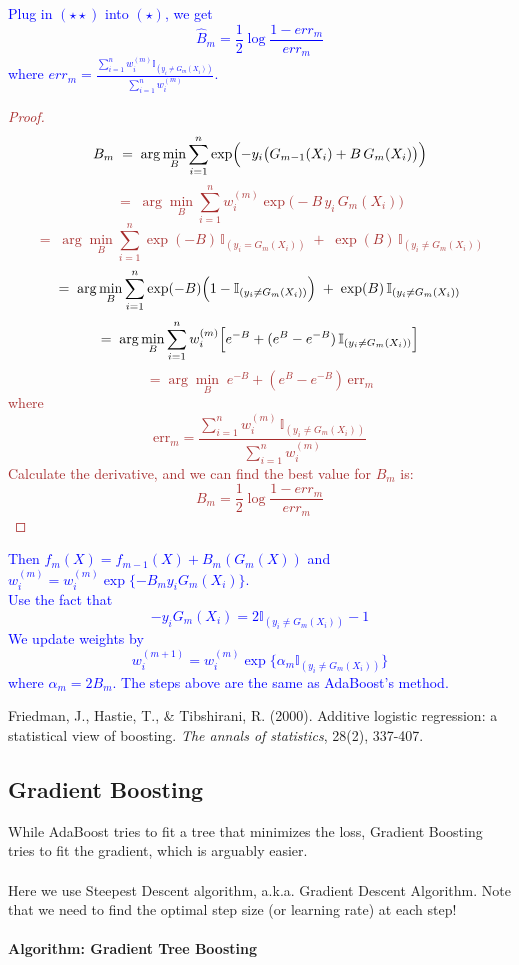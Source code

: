 \documentclass[12pt]{book}
\theoremstyle{definition}
\theoremstyle{remark}
\begin{document}
\textcolor{blue}{
Plug in $(\star\star)$ into $(\star)$, we get
\[\hat{B}_m = \frac12\log \frac{1-err_m}{err_m}\]
where $err_m = \frac{\sum_{i=1}^n w_i^{(m)}\mathbb{I}_{(y_i \ne G_m(X_i))}}{\sum_{i=1}^n w_i^{(m)}}$.}
\textcolor{brown}{
\begin{proof}
\[
B_m \;=\;\arg\min_{B}\sum_{i=1}^n\exp\Bigl(-y_i\bigl(G_{m-1}(X_i)+B\,G_m(X_i)\bigr)\Bigr)
\]
\[=\;\arg\min_{B}\sum_{i=1}^n w_i^{(m)}\exp\bigl(-B\,y_i\,G_m(X_i)\bigr)\]
\[=\;\arg\min_{B}\sum_{i=1}^n\exp(-B)\,\mathbb{I}_{(y_i=G_m(X_i))}
  \;+\;\exp(B)\,\mathbb{I}_{(y_i\neq G_m(X_i))}\]
\[=\;\arg\min_{B}\sum_{i=1}^n\exp(-B)\Bigl(1-\mathbb{I}_{(y_i\neq G_m(X_i))}\Bigr)\;+\;\exp(B)\,\mathbb{I}_{(y_i\neq G_m(X_i))}\]
\[=\;\arg\min_{B}\sum_{i=1}^n w_i^{(m)}\Bigl[e^{-B}+(e^{B}-e^{-B})\,\mathbb{I}_{(y_i\neq G_m(X_i))}\Bigr]\]
\[=\arg\min_{B}\;e^{-B} + (e^{B}-e^{-B})\,\mathrm{err}_m\]
where 
\[\mathrm{err}_m=\frac{\sum_{i=1}^n w_i^{(m)}\,\mathbb{I}_{(y_i\neq G_m(X_i))}}{\sum_{i=1}^n w_i^{(m)}}\]
Calculate the derivative, and we can find the best value for $B_m$ is:
\[B_m = \frac12\log \frac{1-err_m}{err_m}\]
\end{proof}
}
\textcolor{blue}{
Then $f_m(X) = f_{m-1}(X)+B_m(G_m(X))$ and $w_i^{(m)} = w_i^{(m)}\exp\{-B_my_iG_m(X_i)\}$.\\
Use the fact that \[-y_iG_m(X_i) = 2\mathbb{I}_{(y_i \ne G_m(X_i))}-1\]
We update weights by
\[w_i^{(m+1)} = w_i^{(m)} \exp\{\alpha_m\mathbb{I}_{(y_i\ne G_m(X_i))}\}\]
where $\alpha_m = 2B_m$. The steps above are the same as AdaBoost's method. 
}


\begin{referencebox}
    Friedman, J., Hastie, T., \& Tibshirani, R. (2000). Additive logistic regression: a statistical view of boosting. \textit{The annals of statistics}, 28(2), 337-407.
\end{referencebox}




\subsection{Gradient Boosting}
While AdaBoost tries to fit a tree that minimizes the loss, Gradient Boosting tries to fit the gradient, which is arguably easier. \\
\\
Here we use Steepest Descent algorithm, a.k.a. Gradient Descent Algorithm. Note that we need to find the optimal step size (or learning rate) at each step!


\paragraph{Algorithm: Gradient Tree Boosting}
\end{document}
